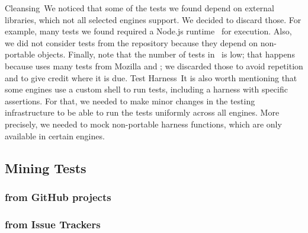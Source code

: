\documentclass[smallextended]{svjour3}
\begin{document}

\lbrack{}Cleansing\rbrack{}~We noticed that some of the tests we found
depend on external libraries, which not all selected engines
support. We decided to discard those. For example, many tests we found
required a Node.js runtime~\cite{node} for execution. Also, we did not
consider tests from the \chakra{} repository because they depend on
non-portable objects.
Finally, note that the number of tests in
\veight\ is low; that happens because \veight{} uses many tests from
Mozilla and \jsc; we discarded those to avoid repetition and to give
credit where it is due. \lbrack{}Test Harness\rbrack{}~It is also
worth mentioning that some engines use a custom shell to run tests,
including a harness with specific assertions.  For that, we needed to
make minor changes in the testing infrastructure to be able to run the
tests uniformly across all engines. More precisely, we needed to mock
non-portable harness functions, which are only available in certain
engines.

\subsection{Mining Tests}

\subsubsection{from GitHub projects}


\subsubsection{from Issue Trackers}
\end{document}
